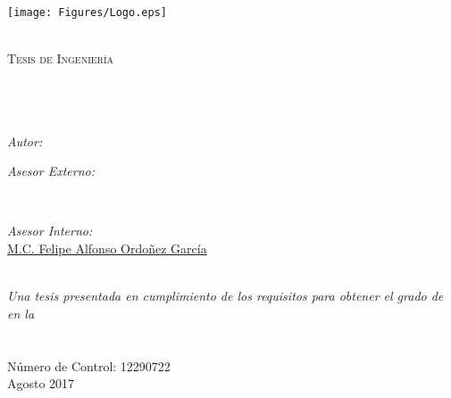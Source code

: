 \documentclass[11pt, oneside]{Thesis} %
\begin{document}
\begin{titlepage}
\begin{center}


\texttt{[image: Figures/Logo.eps]}

\textsc{\LARGE \univname}\\[1.5cm] %



\textsc{\Large Tesis de Ingeniería}\\[0.5cm] %

\HRule \\[0.4cm] %
{\huge \bfseries \ttitle}\\[0.4cm] %
\HRule \\[1.5cm] %
 
\begin{minipage}{0.4\textwidth}
\begin{flushleft} \large
\emph{Autor:}\\
\href{mail:baciliooscar@gmail.com}{\authornames} %
\end{flushleft}
\end{minipage}
\begin{minipage}{0.4\textwidth}
\begin{flushright} \large
\emph{Asesor Externo:} \\
\href{mail:jsalazar@gdl.cinvestav.mx}{\supname} %
\end{flushright}
\end{minipage}\\[15mm]
 \begin{minipage}[t]{0.6\textwidth}
\centering
\emph{Asesor Interno:} \\
\href{https://google.com}{M.C. Felipe Alfonso Ordoñez García}
\end{minipage}\\[1.7cm]
\large \textit{Una tesis presentada en cumplimiento de los requisitos para obtener el grado de \degreename}\\[0.3cm] %
\textit{en la}\\[0.4cm]
\groupname\\\deptname\\[8mm] %
Número de Control: 12290722\\[8mm]
 
{\large Agosto 2017}\\ %
 
\vfill
\end{center}

\end{titlepage}
\end{document}
